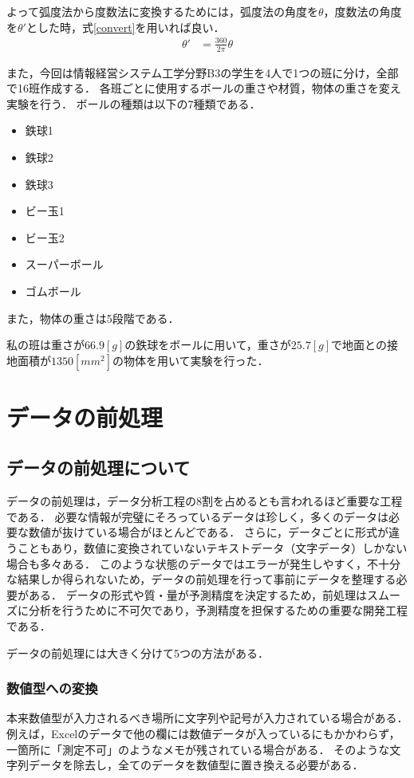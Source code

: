\documentclass[titlepage,a4paper]{jsarticle}
\begin{document}
よって弧度法から度数法に変換するためには，弧度法の角度を$\theta$，度数法の角度を$\theta'$とした時，式\eqref{convert}を用いれば良い．
\begin{align}
  \theta' & = \frac{360}{2\pi}\theta \label{convert}
\end{align}

また，今回は情報経営システム工学分野B3の学生を4人で1つの班に分け，全部で16班作成する．
各班ごとに使用するボールの重さや材質，物体の重さを変え実験を行う．
ボールの種類は以下の7種類である．
\begin{itemize}
  \item 鉄球1
  \item 鉄球2
  \item 鉄球3
  \item ビー玉1
  \item ビー玉2
  \item スーパーボール
  \item ゴムボール
\end{itemize}
また，物体の重さは5段階である．

私の班は重さが$66.9[g]$の鉄球をボールに用いて，重さが$25.7[g]$で地面との接地面積が$1350[mm^{2}]$の物体を用いて実験を行った．


\section{データの前処理}
\subsection{データの前処理について}
データの前処理は，データ分析工程の8割を占めるとも言われるほど重要な工程である．
必要な情報が完璧にそろっているデータは珍しく，多くのデータは必要な数値が抜けている場合がほとんどである．
さらに，データごとに形式が違うこともあり，数値に変換されていないテキストデータ（文字データ）しかない場合も多々ある．
このような状態のデータではエラーが発生しやすく，不十分な結果しか得られないため，データの前処理を行って事前にデータを整理する必要がある．
データの形式や質・量が予測精度を決定するため，前処理はスムーズに分析を行うために不可欠であり，予測精度を担保するための重要な開発工程である．

データの前処理には大きく分けて5つの方法がある．
\subsubsection{数値型への変換}
本来数値型が入力されるべき場所に文字列や記号が入力されている場合がある．
例えば，Excelのデータで他の欄には数値データが入っているにもかかわらず，一箇所に「測定不可」のようなメモが残されている場合がある．
そのような文字列データを除去し，全てのデータを数値型に置き換える必要がある．
\end{document}
